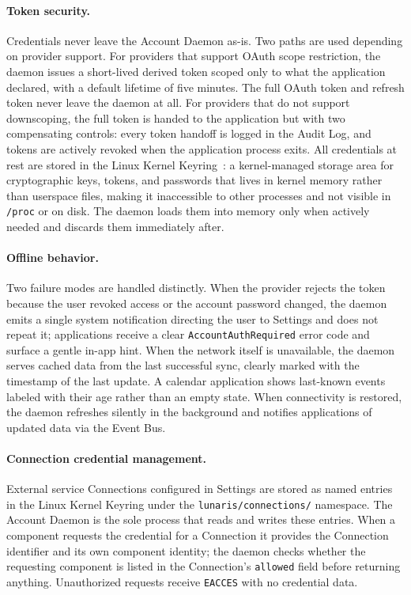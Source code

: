 \paragraph{Token security.}
Credentials never leave the Account Daemon as-is. Two paths are used
depending on provider support. For providers that support OAuth scope
restriction, the daemon issues a short-lived derived token scoped only to
what the application declared, with a default lifetime of five minutes. The
full OAuth token and refresh token never leave the daemon at all. For
providers that do not support downscoping, the full token is handed to the
application but with two compensating controls: every token handoff is logged
in the Audit Log, and tokens are actively revoked when the application process
exits. All credentials at rest are stored in the Linux Kernel Keyring~\cite{archwiki:keyring}: a kernel-managed storage
area for cryptographic keys, tokens, and passwords that lives in kernel memory
rather than userspace files, making it inaccessible to other processes and not
visible in \texttt{/proc} or on disk. The daemon
loads them into memory only when actively needed and discards them immediately
after.

\paragraph{Offline behavior.}
Two failure modes are handled distinctly. When the provider rejects the token
because the user revoked access or the account password changed, the daemon
emits a single system notification directing the user to Settings and does not
repeat it; applications receive a clear \texttt{AccountAuthRequired} error
code and surface a gentle in-app hint. When the network itself is unavailable,
the daemon serves cached data from the last successful sync, clearly marked
with the timestamp of the last update. A calendar application shows last-known
events labeled with their age rather than an empty state. When connectivity
is restored, the daemon refreshes silently in the background and notifies
applications of updated data via the Event Bus.

\paragraph{Connection credential management.}
External service Connections configured in Settings are stored as named
entries in the Linux Kernel Keyring under the \texttt{lunaris/connections/}
namespace. The Account Daemon is the sole process that reads and writes these
entries. When a component requests the credential for a Connection it provides
the Connection identifier and its own component identity; the daemon checks
whether the requesting component is listed in the Connection's \texttt{allowed}
field before returning anything. Unauthorized requests receive
\texttt{EACCES} with no credential data.

